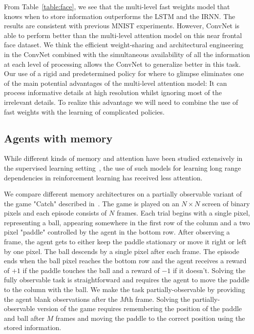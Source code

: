 \documentclass{article}
\begin{document}
From Table~\ref{table:face}, we see that the multi-level fast weights model that knows when to store information outperforms the LSTM and the IRNN.  The results are consistent with previous MNIST experiments. However, ConvNet is able to perform better than the multi-level attention model on this near frontal face dataset. We think the efficient weight-sharing and architectural engineering in the ConvNet combined with the simultaneous availability of all the information at each level of processing allows the ConvNet to generalize better in this task. Our use of a rigid and predetermined policy for where to glimpse eliminates one of the main potential advantages of the multi-level attention model: It can process informative details at high resolution whilst ignoring most of the irrelevant details.  To realize this advantage we will need to combine the use of fast weights with the learning of complicated policies.

\subsection{Agents with memory} \label{section:agents}

While different kinds of memory and attention have been studied extensively in the supervised learning setting~\citep{lstm-handwriting,recurrent-attention,neural-machine-translation}, the use of such models for learning long range dependencies in reinforcement learning has received less attention.

We compare different memory architectures on a partially observable variant of the game "Catch" described in~\citep{recurrent-attention}.
The game is played on an $N\times N$ screen of binary pixels and each episode consists of $N$ frames.
Each trial begins with a single pixel, representing a ball, appearing somewhere in the first row of the column and a two pixel "paddle" controlled by the agent in the bottom row.
After observing a frame, the agent gets to either keep the paddle stationary or move it right or left by one pixel.
The ball descends by a single pixel after each frame.
The episode ends when the ball pixel reaches the bottom row and the agent receives a reward of $+1$ if the paddle touches the ball and a reward of $-1$ if it doesn't.
Solving the fully observable task is straightforward and requires the agent to move the paddle to the column with the ball.
We make the task partially-observable by providing the agent blank observations after the $M$th frame.
Solving the partially-observable version of the game requires remembering the position of the paddle and ball after $M$ frames and moving the paddle to the correct position using the stored information.
\end{document}

